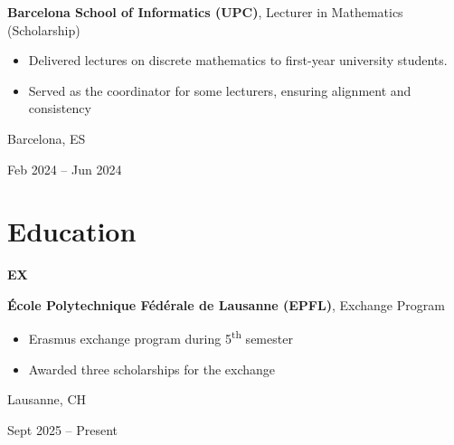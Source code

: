 \documentclass[10pt, letterpaper]{article}
\newenvironment{highlights}{
    \begin{itemize}[
        topsep=0.10 cm,
        parsep=0.10 cm,
        partopsep=0pt,
        itemsep=0pt,
        leftmargin=0.4 cm + 10pt
    ]
}{
    \end{itemize}
} %
\newenvironment{twocolentry}[2][]{
    \onecolentry
    \def\secondColumn{#2}
    \setcolumnwidth{\fill, 4.5 cm}
    \begin{paracol}{2}
}{
    \switchcolumn \raggedleft \secondColumn
    \end{paracol}
    \endonecolentry
} %
\newenvironment{threecolentry}[3][]{
    \onecolentry
    \def\thirdColumn{#3}
    \setcolumnwidth{1 cm, \fill, 4.5 cm}
    \begin{paracol}{3}
    {\raggedright #2} \switchcolumn
}{
    \switchcolumn \raggedleft \thirdColumn
    \end{paracol}
    \endonecolentry
} %
\begin{document}
        \begin{twocolentry}{
            Barcelona, ES

            Feb 2024 – Jun 2024
        }
            \textbf{Barcelona School of Informatics (UPC)}, Lecturer in Mathematics (Scholarship)
            \begin{highlights}
                \item Delivered lectures on discrete mathematics to first-year university students.
                \item Served as the coordinator for some lecturers, ensuring alignment and consistency
            \end{highlights}
        \end{twocolentry}

%
%
%
%
%            


    \section{Education}
        \begin{threecolentry}{\textbf{EX}}{
            Lausanne, CH
            
            Sept 2025 – Present
        }
            \textbf{École Polytechnique Fédérale de Lausanne (EPFL)}, Exchange Program
            \begin{highlights}
                \item Erasmus exchange program during 5\textsuperscript{th} semester
                \item Awarded three scholarships for the exchange
            \end{highlights}
        \end{threecolentry}
    
\end{document}
